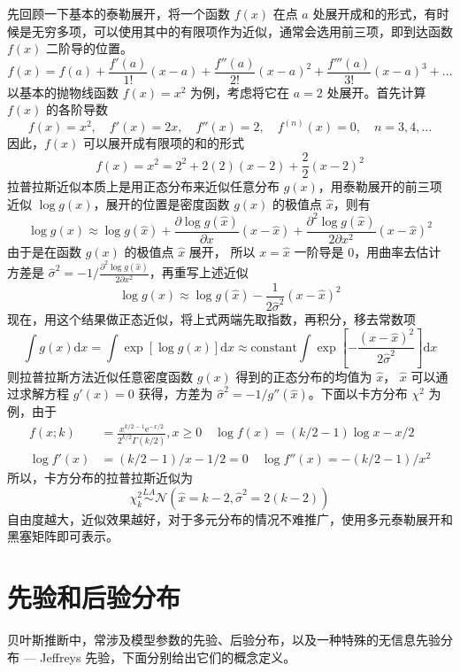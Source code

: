 \documentclass[12pt,a4paper,UTF8,twoside]{book}
\theoremstyle{definition}
\theoremstyle{definition}
\theoremstyle{definition}
\theoremstyle{remark}
\begin{document}
先回顾一下基本的泰勒展开，将一个函数 \(f(x)\) 在点 \(a\)
处展开成和的形式，有时候是无穷多项，可以使用其中的有限项作为近似，通常会选用前三项，即到达函数
\(f(x)\) 二阶导的位置。
\[ f(x) = f(a) + \frac{f'(a)}{1!}(x-a) + \frac{f''(a)}{2!}(x-a)^2 + \frac{f'''(a)}{3!}(x-a)^3 + \ldots \]
\noindent 以基本的抛物线函数 \(f(x) = x^2\) 为例，考虑将它在 \(a = 2\)
处展开。首先计算 \(f(x)\) 的各阶导数
\[ f(x) = x^2, \quad f'(x) = 2x, \quad f''(x) = 2, \quad f^{(n)}(x) = 0, \quad n = 3,4,\ldots \]
\noindent 因此，\(f(x)\) 可以展开成有限项的和的形式
\[ f(x) = x^2 = 2^2 + 2(2)(x-2) + \frac{2}{2}(x-2)^2 \]
拉普拉斯近似本质上是用正态分布来近似任意分布
\(g(x)\)，用泰勒展开的前三项近似 \(\log g(x)\)，展开的位置是密度函数
\(g(x)\) 的极值点 \(\hat{x}\)，则有
\[ \log g(x) \approx \log g(\hat{x}) + \frac{\partial \log g(\hat{x})}{\partial x} (x - \hat{x}) + \frac{\partial^2 \log g(\hat{x})}{2\partial x^2} (x - \hat{x})^2 \]
\noindent 由于是在函数 \(g(x)\) 的极值点 \(\hat{x}\) 展开， 所以
\(x = \hat{x}\) 一阶导是 0，用曲率去估计方差是
\(\hat{\sigma}^2 = -1/\frac{\partial^2 \log g(\hat{x})}{2\partial x^2}\)，再重写上述近似
\[ \log g(x) \approx \log g(\hat{x}) - \frac{1}{2\hat{\sigma}^2} (x - \hat{x})^2 \]
\noindent 现在，用这个结果做正态近似，将上式两端先取指数，再积分，移去常数项
\[ \int g(x) \mathrm{d}x = \int \exp[\log g(x)] \mathrm{d}x \approx \mathrm{constant} \int \exp[- \frac{(x - \hat{x})^2}{2\hat{\sigma}^2}] \mathrm{d}x \]
\noindent 则拉普拉斯方法近似任意密度函数 \(g(x)\) 得到的正态分布的均值为
\(\hat{x}\)， \(\hat{x}\) 可以通过求解方程 \(g'(x) = 0\) 获得，方差为
\(\hat{\sigma}^2 = -1/g''(\hat{x})\)。下面以卡方分布 \(\chi^2\)
为例，由于 \begin{align*}
    f(x; k) & = \frac{ x^{k/2-1} \mathrm{e}^{-x/2} }{ 2^{k/2}\Gamma(k/2) }, x \geq 0 \quad \log f(x) = (k/2 - 1) \log x - x/2 \\
 \log f'(x) & = (k/2-1)/x - 1/2 = 0 \quad \log f''(x)  = -(k/2-1)/x^2
\end{align*} \noindent 所以，卡方分布的拉普拉斯近似为
\[ \chi_{k}^2 \overset{LA}{\sim}  \mathcal{N}(\hat{x} = k-2, \hat{\sigma}^2 = 2(k-2)) \]
\noindent 自由度越大，近似效果越好，对于多元分布的情况不难推广，使用多元泰勒展开和黑塞矩阵即可表示\citep{Tierney1986}。

\hypertarget{sec:bayes-prior}{%
\section{先验和后验分布}\label{sec:bayes-prior}}

贝叶斯推断中，常涉及模型参数的先验、后验分布，以及一种特殊的无信息先验分布
--- Jeffreys 先验，下面分别给出它们的概念定义\citep{mao2006}。
\end{document}
